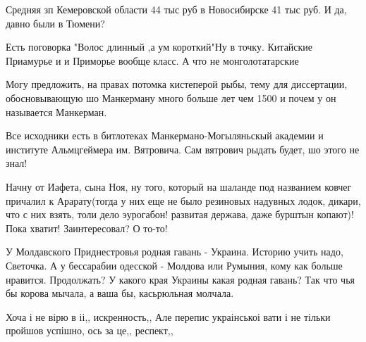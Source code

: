 \begin{itemize}
Средняя зп Кемеровской области 44 тыс руб в Новосибирске 41 тыс руб. И да, давно были в Тюмени?

 
Есть поговорка "Волос длинный ,а ум короткий"Ну в точку. Китайские Приамурье и
и Приморье вообще класс. А что не монголотатарские🤣🤣🤣

 

Могу предложить, на правах потомка кистеперой рыбы, тему для диссертации,
обосновывающую шо Манкерману много больше лет чем 1500 и почем у он называется
Манкерман. 

Все исходники есть в битлотеках Манкермано-Могыляньскый академии и институте
Альмцгеймера им. Вятровича. Сам вятрович рыдать будет, шо этого не знал! 

Начну от Иафета, сына Ноя, ну того, который на шаланде под названием ковчег
причалил к Арарату(тогда у них еще не было резиновых надувных лодок, дикари,
что с них взять, толи дело эурогабон! развитая держава, даже бурштын копают)!
Пока хватит! Заинтересовал? О то-то!


 

У Молдавского Приднестровья родная гавань - Украина. Историю учить надо,
Светочка. А у бессарабии одесской - Молдова или Румыния, кому как больше
нравится. Продолжать? У какого края Украины какая родная гавань? Так что чья бы
корова мычала, а ваша бы, касьрюльная молчала.

 
Хоча і не вірю в іі,, искренность,, Але перепис украінськоі вати і не тільки пройшов успішно, ось за це,, респект,,


\end{itemize}
